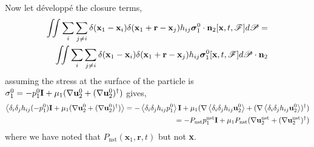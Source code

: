 \documentclass[12pt]{My_preprint}
\begin{document}
Now let développé the closure terms,
\begin{align*}
    \iint
    \sum_i  
    \sum_{j\neq i}
    \delta(\textbf{x}_1-\textbf{x}_i)
    \delta(\textbf{x}_1+\textbf{r}-\textbf{x}_j)h_{ij} 
    \bm\sigma_1^0 \cdot \textbf{n}_2 [\textbf{x},t,\mathscr{F}]
    d\mathscr{P}
    = \\
    \iint
    \sum_i  
    \sum_{j\neq i}
    \delta(\textbf{x}_1-\textbf{x}_i)
    \delta(\textbf{x}_1+\textbf{r}-\textbf{x}_j)h_{ij} 
    \bm \sigma_1^0 [\textbf{x},t,\mathscr{F}]
    d\mathscr{P}\cdot \textbf{n}_2
\end{align*} 
assuming the stress at the surface of the particle is  $\sigma_1^0  = -p_1^0 \textbf{I} + \mu_1 (\mathbf{\nabla} \textbf{u}_2^0+  (\mathbf{\nabla} \textbf{u}_2^0)^\dagger)$ gives, 
\begin{align*}
    \left<\delta_i \delta_j h_{ij} (-p_1^0) \textbf{I} + \mu_1 (\mathbf{\nabla} \textbf{u}_2^0+  (\mathbf{\nabla} \textbf{u}_2^0)^\dagger)\right>
    = 
    - \left<\delta_i \delta_j h_{ij} p_1^0\right> \textbf{I} 
    + \mu_1 (\mathbf{\nabla}  \left<\delta_i \delta_j h_{ij}\textbf{u}_2^0\right>+  (\mathbf{\nabla}  \left<\delta_i \delta_j h_{ij}\textbf{u}_2^0\right>)^\dagger)\\
    = 
    - P_\text{nst} p_1^\text{nst} \textbf{I} 
    + \mu_1 P_\text{nst}(\mathbf{\nabla}  \textbf{u}_2^\text{nst}+  (\mathbf{\nabla}  \textbf{u}_2^\text{nst})^\dagger)\\
\end{align*}
where we have noted that $P_\text{nst}(\textbf{x}_1,\textbf{r},t)$ but not \textbf{x}. 
\end{document}
